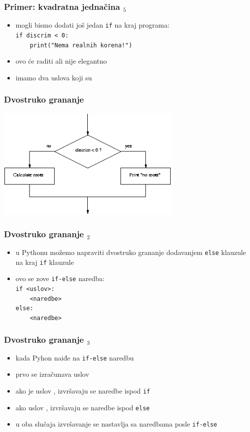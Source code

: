 \documentclass[utf8,compress]{beamer}
\begin{document}
\begin{frame}[fragile]
  \frametitle{Primer: kvadratna jednačina $_5$}
  \begin{itemize}
    \item mogli bismo dodati još jedan \texttt{if} na kraj programa: \\
        \texttt{if discrim < 0:} \\
        \texttt{\ \ \ \ print("Nema realnih korena!")}
    \item ovo će raditi ali nije elegantno
    \item imamo dva uslova koji su 
  \end{itemize}
\end{frame}

\begin{frame}[fragile]
  \frametitle{Dvostruko grananje}
  \begin{center}
    \includegraphics[width=9cm]{pic15}
  \end{center}
\end{frame}

\begin{frame}[fragile]
  \frametitle{Dvostruko grananje $_2$}
  \begin{itemize}
    \item u Pythonu možemo napraviti dvostruko grananje dodavanjem \texttt{else} klauzule na kraj \texttt{if} klauzule
    \item ovo se zove \texttt{if-else} naredba: \\
        \texttt{if <uslov>:} \\
        \texttt{\ \ \ \ <naredbe>} \\
        \texttt{else:} \\
        \texttt{\ \ \ \ <naredbe>}
  \end{itemize}
\end{frame}

\begin{frame}[fragile]
  \frametitle{Dvostruko grananje $_3$}
  \begin{itemize}
    \item kada Pyhon naiđe na \texttt{if-else} naredbu
    \item prvo se izračunava uslov
    \item ako je uslov , izvršavaju se naredbe ispod \texttt{if}
    \item ako uslov , izvršavaju se naredbe ispod \texttt{else}
    \item u oba slučaja izvršavanje se nastavlja sa naredbama posle \texttt{if-else}
  \end{itemize}
\end{frame}
\end{document}
